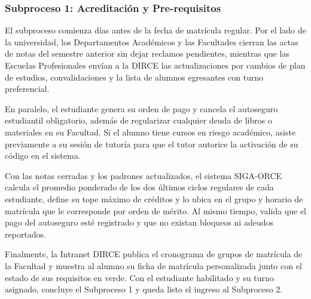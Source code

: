 \subsubsection{Subproceso 1: Acreditación y Pre-requisitos}

El subproceso comienza días antes de la fecha de matrícula regular. Por el lado de la universidad, los Departamentos Académicos y las Facultades cierran las actas de notas del semestre anterior sin dejar reclamos pendientes, mientras que las Escuelas Profesionales envían a la DIRCE las actualizaciones por cambios de plan de estudios, convalidaciones y la lista de alumnos egresantes con turno preferencial.

En paralelo, el estudiante genera su orden de pago y cancela el autoseguro estudiantil obligatorio, además de regularizar cualquier deuda de libros o materiales en su Facultad. Si el alumno tiene cursos en riesgo académico, asiste previamente a su sesión de tutoría para que el tutor autorice la activación de su código en el sistema.

Con las notas cerradas y los padrones actualizados, el sistema SIGA-ORCE calcula el promedio ponderado de los dos últimos ciclos regulares de cada estudiante, define su tope máximo de créditos y lo ubica en el grupo y horario de matrícula que le corresponde por orden de mérito. Al mismo tiempo, valida que el pago del autoseguro esté registrado y que no existan bloqueos ni adeudos reportados.

Finalmente, la Intranet DIRCE publica el cronograma de grupos de matrícula de la Facultad y muestra al alumno su ficha de matrícula personalizada junto con el estado de sus requisitos en verde. Con el estudiante habilitado y su turno asignado, concluye el Subproceso 1 y queda listo el ingreso al Subproceso 2.
